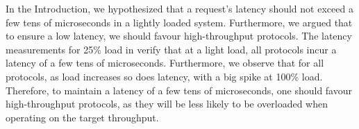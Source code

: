 In the Introduction, we hypothesized that a request's latency should not exceed a few tens of microseconds in a lightly loaded system. 
Furthermore, we argued that to ensure a low latency, we should favour high-throughput protocols. %
The latency measurements for 25\% load in  verify that at a light load, all protocols incur a latency of a few tens of microseconds. 
Furthermore, we observe that for all protocols, as load increases so does latency, with a big spike at 100\% load. Therefore, to maintain a latency of a few tens of microseconds, 
one should favour high-throughput protocols, as they will be less likely to be overloaded when operating on the target throughput. %



